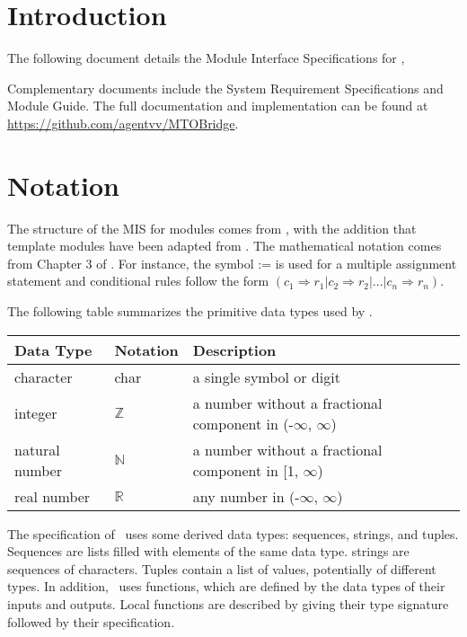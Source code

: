 \documentclass[12pt, titlepage]{article}
\begin{document}

\section{Introduction}

The following document details the Module Interface Specifications for
\progname{}, 

Complementary documents include the System Requirement Specifications
and Module Guide.  The full documentation and implementation can be
found at \url{https://github.com/agentvv/MTOBridge}.

\section{Notation}

The structure of the MIS for modules comes from \citet{HoffmanAndStrooper1995},
with the addition that template modules have been adapted from
\cite{GhezziEtAl2003}.  The mathematical notation comes from Chapter 3 of
\citet{HoffmanAndStrooper1995}.  For instance, the symbol := is used for a
multiple assignment statement and conditional rules follow the form $(c_1
\Rightarrow r_1 | c_2 \Rightarrow r_2 | ... | c_n \Rightarrow r_n )$.

The following table summarizes the primitive data types used by \progname. 

\begin{center}
\renewcommand{\arraystretch}{1.2}
\noindent 
\begin{tabular}{l l p{7.5cm}} 
\toprule 
\textbf{Data Type} & \textbf{Notation} & \textbf{Description}\\ 
\midrule
character & char & a single symbol or digit\\
integer & $\mathbb{Z}$ & a number without a fractional component in (-$\infty$, $\infty$) \\
natural number & $\mathbb{N}$ & a number without a fractional component in [1, $\infty$) \\
real number & $\mathbb{R}$ & any number in (-$\infty$, $\infty$)\\
\bottomrule
\end{tabular} 
\end{center}

\noindent
The specification of \progname \ uses some derived data types: sequences, strings, and
tuples. Sequences are lists filled with elements of the same data type. strings
are sequences of characters. Tuples contain a list of values, potentially of
different types. In addition, \progname \ uses functions, which
are defined by the data types of their inputs and outputs. Local functions are
described by giving their type signature followed by their specification.
\end{document}
